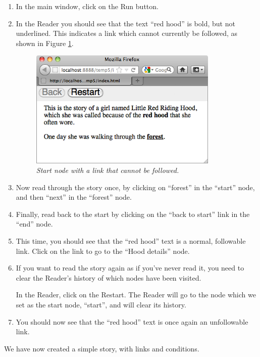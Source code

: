 \documentclass{article}
\begin{document}
\begin{enumerate}
  \item In the main window, click on the Run button.
  \item In the Reader you should see that the text ``red hood'' is bold,
  but not underlined. This indicates a link which cannot currently be
  followed, as shown in Figure \ref{fig:start_with_condition}.
 
\begin{figure}[ht]
  \centering
  \includegraphics[width=9cm]{images/hypedyn-tutorial-1-figure-15}
  \caption{\textit{Start node with a link that cannot be followed.}}
  \label{fig:start_with_condition}
\end{figure} 

\item Now read through the story once, by clicking on ``forest'' in the
``start'' node, and then ``next'' in the ``forest'' node.
\item Finally, read back to the start by clicking on the ``back to start'' link
in the ``end'' node.
\item This time, you should see that the ``red hood'' text is a normal,
followable link. Click on the link to go to the ``Hood details'' node.

\item If you want to read the story again as if you've never read it, you need
to clear the Reader's history of which nodes have been visited.

In the Reader, click on the Restart. The Reader will go to the node which
we set as the start node, ``start'', and will clear its history.

\item You should now see that the ``red hood'' text is once again an
unfollowable link.
\end{enumerate}

We have now created a simple story, with links and conditions.
\end{document}
